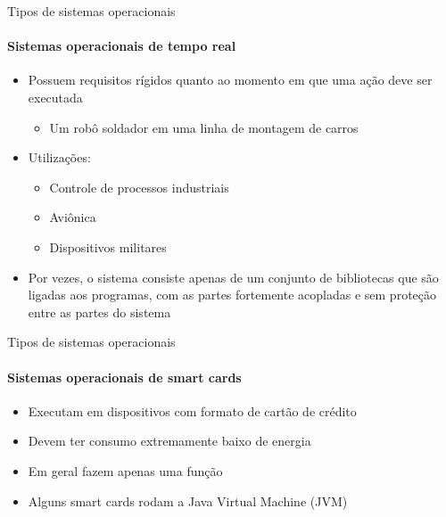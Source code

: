 \documentclass{beamer}
\begin{document}
\begin{frame}{Tipos de sistemas operacionais}
	\framesubtitle{Sistemas operacionais de tempo real}
	\begin{itemize}
		\item Possuem requisitos rígidos quanto ao momento em que uma ação deve ser executada
		\begin{itemize}
			\item Um robô soldador em uma linha de montagem de carros
		\end{itemize}
		\item Utilizações:
		\begin{itemize}
			\item Controle de processos industriais
			\item Aviônica
			\item Dispositivos militares
		\end{itemize}
		\item Por vezes, o sistema consiste apenas de um conjunto de bibliotecas que são ligadas aos programas, com as partes fortemente acopladas e sem proteção entre as partes do sistema
	\end{itemize}
\end{frame}
\begin{frame}{Tipos de sistemas operacionais}
	\framesubtitle{Sistemas operacionais de smart cards}
	\begin{itemize}
		\item Executam em dispositivos com formato de cartão de crédito
		\item Devem ter consumo extremamente baixo de energia
		\item Em geral fazem apenas uma função
		\item Alguns smart cards rodam a Java Virtual Machine (JVM)
	\end{itemize}
\end{frame}
\end{document}

